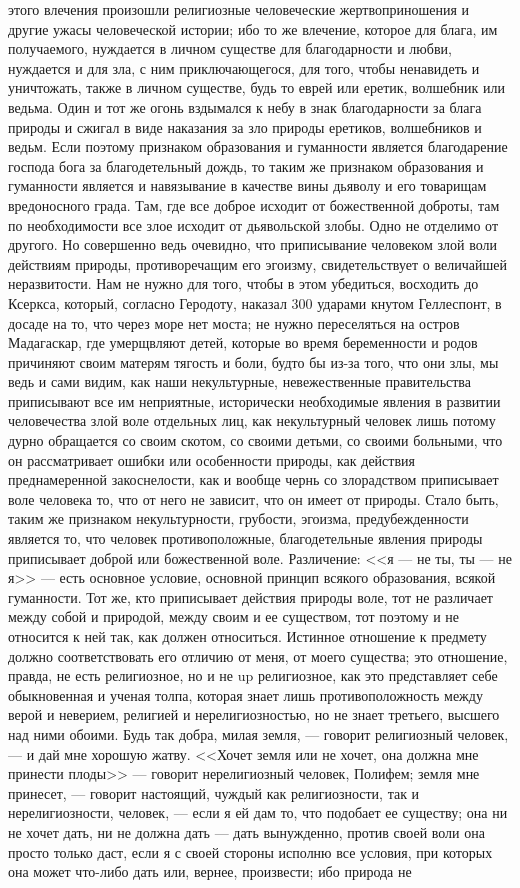\documentclass[12pt]{article}
\begin{document}
этого влечения произошли религиозные человеческие жертвоприношения и другие ужасы человеческой истории; ибо то же влечение, которое для блага, им получаемого, нуждается в личном существе для благодарности и любви, нуждается и для зла, с ним приключающегося, для того, чтобы ненавидеть и уничтожать, также в личном существе, будь то еврей или еретик, волшебник или ведьма. Один и тот же огонь вздымался к небу в знак благодарности за блага природы и сжигал в виде наказания за зло природы еретиков, волшебников и ведьм. Если поэтому признаком образования и гуманности является благодарение господа бога за благодетельный дождь, то таким же признаком образования и гуманности является и навязывание в качестве вины дьяволу и его товарищам вредоносного града. Там, где все доброе исходит от божественной доброты, там по необходимости все злое исходит от дьявольской злобы. Одно не отделимо от другого. Но совершенно ведь очевидно, что приписывание человеком злой воли действиям природы, противоречащим его эгоизму, свидетельствует о величайшей неразвитости. Нам не нужно для того, чтобы в этом убедиться, восходить до Ксеркса, который, согласно Геродоту, наказал 300 ударами кнутом Геллеспонт, в досаде на то, что через море нет моста; не нужно переселяться на остров Мадагаскар, где умерщвляют детей, которые во время беременности и родов причиняют своим матерям тягость и боли, будто бы из-за того, что они злы, мы ведь и сами видим, как наши некультурные, невежественные правительства приписывают все им неприятные, исторически необходимые явления в развитии человечества злой воле отдельных лиц, как некультурный человек лишь потому дурно обращается со своим скотом, со своими детьми, со своими больными, что он рассматривает ошибки или особенности природы, как действия преднамеренной закоснелости, как и вообще чернь со злорадством приписывает воле человека то, что от него не зависит, что он имеет от природы. Стало быть, таким же признаком некультурности, грубости, эгоизма, предубежденности является то, что человек противоположные, благодетельные явления природы приписывает доброй или божественной воле. Различение: <<я --- не ты, ты --- не я>> --- есть основное условие, основной принцип всякого образования, всякой гуманности. Тот же, кто приписывает действия природы воле, тот не различает между собой и природой, между своим и ее существом, тот поэтому и не относится к ней так, как должен относиться. Истинное отношение к предмету должно соответствовать его отличию от меня, от моего существа; это отношение, правда, не есть религиозное, но и не up религиозное, как это представляет себе обыкновенная и ученая толпа, которая знает лишь противоположность между верой и неверием, религией и нерелигиозностью, но не знает третьего, высшего над ними обоими. Будь так добра, милая земля, --- говорит религиозный человек, --- и дай мне хорошую жатву. <<Хочет земля или не хочет, она должна мне принести плоды>>  --- говорит нерелигиозный человек, Полифем; земля мне принесет, --- говорит настоящий, чуждый как религиозности, так и нерелигиозности, человек, --- если я ей дам то, что подобает ее существу; она ни не хочет дать, ни не должна дать --- дать вынужденно, против своей воли она просто только даст, если я с своей стороны исполню все условия, при которых она может что-либо дать или, вернее, произвести; ибо природа не 
\end{document}
